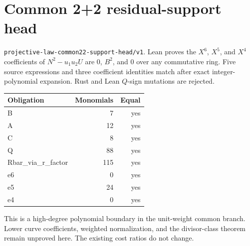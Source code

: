 \documentclass[11pt]{article}
\begin{document}
\section*{Common 2+2 residual-support head}
\texttt{projective-law-common22-support-head/v1}. Lean proves the $X^6$,
$X^5$, and $X^4$ coefficients of $N^2-u_1u_2U$ are $0$, $B^2$, and $0$
over any commutative ring. Five source expressions and three coefficient
identities match after exact integer-polynomial expansion. Rust and Lean
$Q$-sign mutations are rejected.

\begin{center}
\begin{tabular}{lrr}
\toprule
Obligation & Monomials & Equal\\
\midrule
B & 7 & yes\\
A & 12 & yes\\
C & 8 & yes\\
Q & 88 & yes\\
Rbar\_via\_r\_factor & 115 & yes\\
e6 & 0 & yes\\
e5 & 24 & yes\\
e4 & 0 & yes\\
\bottomrule
\end{tabular}
\end{center}
\noindent This is a high-degree polynomial boundary in the unit-weight
common branch. Lower curve coefficients, weighted normalization, and the
divisor-class theorem remain unproved here. The existing cost ratios do not
change.
\end{document}
